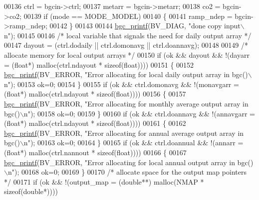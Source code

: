 \begin{DoxyCode}
00136     ctrl = bgcin->ctrl;
00137     metarr = bgcin->metarr;
00138     co2 = bgcin->co2;
00139     \textcolor{keywordflow}{if} (mode == MODE\_MODEL)
00140     \{
00141         ramp\_ndep = bgcin->ramp\_ndep;
00142     \}
00143     
00144     \hyperlink{bgc__io_8c_af287cce6e2aede1ce337de9319e80d0d}{bgc\_printf}(BV\_DIAG, \textcolor{stringliteral}{"done copy input\(\backslash\)n"});
00145 
00146     \textcolor{comment}{/* local variable that signals the need for daily output array */}
00147     dayout = (ctrl.dodaily || ctrl.domonavg || ctrl.doannavg);
00148 
00149     \textcolor{comment}{/* allocate memory for local output arrays */}
00150     \textcolor{keywordflow}{if} (ok && dayout && !(dayarr = (\textcolor{keywordtype}{float}*) malloc(ctrl.ndayout * \textcolor{keyword}{sizeof}(\textcolor{keywordtype}{float}))))
00151     \{
00152         \hyperlink{bgc__io_8c_af287cce6e2aede1ce337de9319e80d0d}{bgc\_printf}(BV\_ERROR, \textcolor{stringliteral}{"Error allocating for local daily output array in bgc()\(\backslash\)n"});
00153         ok=0;
00154     \}
00155     \textcolor{keywordflow}{if} (ok && ctrl.domonavg && !(monavgarr = (\textcolor{keywordtype}{float}*) malloc(ctrl.ndayout * \textcolor{keyword}{sizeof}(\textcolor{keywordtype}{float}))))
00156     \{
00157         \hyperlink{bgc__io_8c_af287cce6e2aede1ce337de9319e80d0d}{bgc\_printf}(BV\_ERROR, \textcolor{stringliteral}{"Error allocating for monthly average output array in bgc()\(\backslash\)n"});
00158         ok=0;
00159     \}
00160     \textcolor{keywordflow}{if} (ok && ctrl.doannavg && !(annavgarr = (\textcolor{keywordtype}{float}*) malloc(ctrl.ndayout * \textcolor{keyword}{sizeof}(\textcolor{keywordtype}{float}))))
00161     \{
00162         \hyperlink{bgc__io_8c_af287cce6e2aede1ce337de9319e80d0d}{bgc\_printf}(BV\_ERROR, \textcolor{stringliteral}{"Error allocating for annual average output array in bgc()\(\backslash\)n"});
00163         ok=0;
00164     \}
00165     \textcolor{keywordflow}{if} (ok && ctrl.doannual && !(annarr = (\textcolor{keywordtype}{float}*) malloc(ctrl.nannout * \textcolor{keyword}{sizeof}(\textcolor{keywordtype}{float}))))
00166     \{
00167         \hyperlink{bgc__io_8c_af287cce6e2aede1ce337de9319e80d0d}{bgc\_printf}(BV\_ERROR, \textcolor{stringliteral}{"Error allocating for local annual output array in bgc()\(\backslash\)n"});
00168         ok=0;
00169     \}
00170     \textcolor{comment}{/* allocate space for the output map pointers */}
00171     \textcolor{keywordflow}{if} (ok && !(output\_map = (\textcolor{keywordtype}{double}**) malloc(NMAP * \textcolor{keyword}{sizeof}(\textcolor{keywordtype}{double}*))))

\end{DoxyCode}
